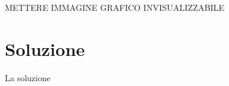 \documentclass{beamer}
\begin{document}
\begin{frame}
METTERE IMMAGINE GRAFICO INVISUALIZZABILE
\end{frame}

\section{Soluzione}
\begin{frame}
La soluzione
\end{frame}
\end{document}

